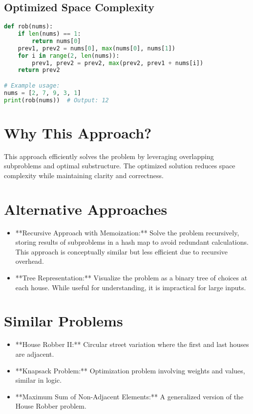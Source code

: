 \subsection*{Optimized Space Complexity}
\begin{fullwidth}
\begin{lstlisting}[language=Python]
def rob(nums):
    if len(nums) == 1:
        return nums[0]
    prev1, prev2 = nums[0], max(nums[0], nums[1])
    for i in range(2, len(nums)):
        prev1, prev2 = prev2, max(prev2, prev1 + nums[i])
    return prev2

# Example usage:
nums = [2, 7, 9, 3, 1]
print(rob(nums))  # Output: 12
\end{lstlisting}
\end{fullwidth}

\section*{Why This Approach?}
This approach efficiently solves the problem by leveraging overlapping subproblems and optimal substructure. The optimized solution reduces space complexity while maintaining clarity and correctness.

\section*{Alternative Approaches}
\begin{itemize}
    \item **Recursive Approach with Memoization:** Solve the problem recursively, storing results of subproblems in a hash map to avoid redundant calculations. This approach is conceptually similar but less efficient due to recursive overhead.
    \item **Tree Representation:** Visualize the problem as a binary tree of choices at each house. While useful for understanding, it is impractical for large inputs.
\end{itemize}

\section*{Similar Problems}
\begin{itemize}
    \item **House Robber II:** Circular street variation where the first and last houses are adjacent.
    \item **Knapsack Problem:** Optimization problem involving weights and values, similar in logic.
    \item **Maximum Sum of Non-Adjacent Elements:** A generalized version of the House Robber problem.
\end{itemize}

